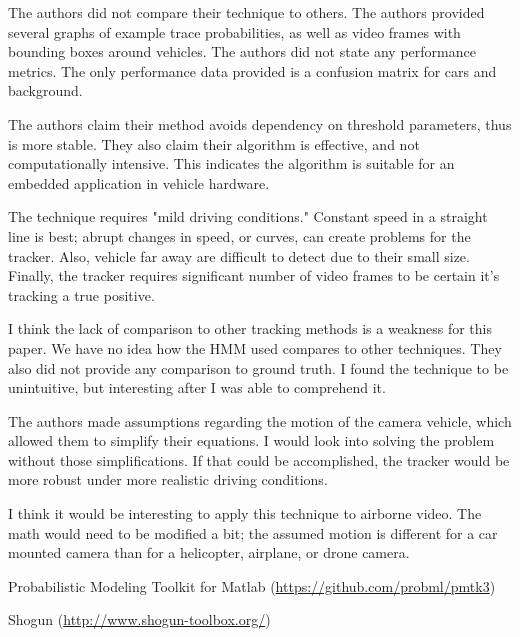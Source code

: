 \documentclass[11pt]{article}
\begin{document}
\begin{description}[leftmargin=0in]
    \item [Experiments] The authors did not compare their technique to others. The authors provided
        several graphs of example trace probabilities, as well as video frames with bounding boxes
        around vehicles. The authors did not state any performance metrics. The only performance
        data provided is a confusion matrix for cars and background.

    \item [Contributions] The authors claim their method avoids dependency on threshold parameters,
        thus is more stable. They also claim their algorithm is effective, and not computationally
        intensive. This indicates the algorithm is suitable for an embedded application in vehicle
        hardware.

    \item [Shortcomings] The technique requires "mild driving conditions." Constant speed in a
        straight line is best; abrupt changes in speed, or curves, can create problems for the
        tracker. Also, vehicle far away are difficult to detect due to their small size. Finally,
        the tracker requires significant number of video frames to be certain it's tracking a true
        positive.

    \item [Self Evaluation] I think the lack of comparison to other tracking methods is a weakness
        for this paper. We have no idea how the HMM used compares to other techniques. They also did
        not provide any comparison to ground truth. I found the technique to be unintuitive, but
        interesting after I was able to comprehend it.

    \item [Improvements] The authors made assumptions regarding the motion of the camera vehicle,
        which allowed them to simplify their equations. I would look into solving the problem
        without those simplifications. If that could be accomplished, the tracker would be more
        robust under more realistic driving conditions.

    \item [Applications] I think it would be interesting to apply this technique to airborne video.
        The math would need to be modified a bit; the assumed motion is different for a car mounted
        camera than for a helicopter, airplane, or drone camera.

    \item [Packages]

        Probabilistic Modeling Toolkit for Matlab (\url{https://github.com/probml/pmtk3})

        Shogun (\url{http://www.shogun-toolbox.org/})

\end{description}

 
\end{document}
